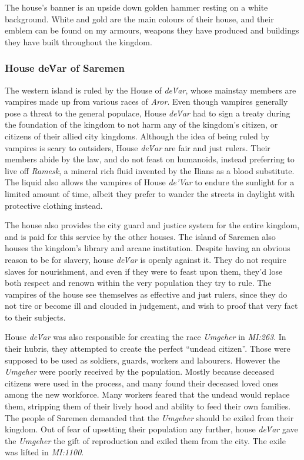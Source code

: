 The house's banner is an upside down golden hammer resting on a white
background. White and gold are the main colours of their house, and their
emblem can be found on my armours, weapons they have produced and buildings
they have built throughout the kingdom.

\subsubsection*{House de\'Var of Saremen}
\label{sec:House deVar}

The western island is ruled by the House of \emph{de\'Var}, whose mainstay
members are vampires made up from various races of \emph{Aror}. Even though
vampires generally pose a threat to the general populace, House \emph{de\'Var}
had to sign a treaty during the foundation of the kingdom to not harm any of
the kingdom's citizen, or citizens of their allied city kingdoms. Although
the idea of being ruled by vampires is scary to outsiders, House \emph{de\'Var}
are fair and just rulers. Their members abide by the law, and do not feast on
humanoids, instead preferring to live off \emph{Ramesk}, a mineral rich fluid
invented by the Ilians as a blood substitute. The liquid also allows the
vampires of House \emph{de'Var} to endure the sunlight for a limited amount of
time, albeit they prefer to wander the streets in daylight with protective
clothing instead.

The house also provides the city guard and justice system for the entire
kingdom, and is paid for this service by the other houses. The island of
Saremen also houses the kingdom's library and arcane institution. Despite
having an obvious reason to be for slavery, house \emph{de\'Var} is openly
against it. They do not require slaves for nourishment, and even if they were
to feast upon them, they'd lose both respect and renown within the very
population they try to rule. The vampires of the house see themselves as
effective and just rulers, since they do not tire or become ill and clouded in
judgement, and wish to proof that very fact to their subjects.

House \emph{de\'Var} was also responsible for creating the race \emph{Umgeher}
in \emph{MI:263}. In their hubris, they attempted to create the perfect
``undead citizen''. Those were supposed to be used as soldiers, guards,
workers and labourers. However the \emph{Umgeher} were poorly received by the
population. Mostly because deceased citizens were used in the process, and
many found their deceased loved ones among the new workforce. Many workers
feared that the undead would replace them, stripping them of their lively hood
and ability to feed their own families. The people of Saremen demanded that
the \emph{Umgeher} should be exiled from their kingdom. Out of fear of
upsetting their population any further, house \emph{de\'Var} gave the
\emph{Umgeher} the gift of reproduction and exiled them from the city. The
exile was lifted in \emph{MI:1100}.

